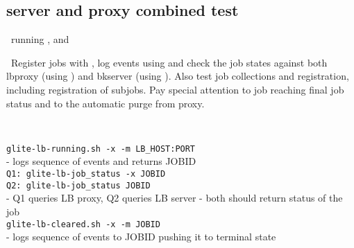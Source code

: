 




\subsection{\LB server and proxy combined test}

\req\ running ,  and

\what\ Register jobs with , log events
using  and check the job states against
both lbproxy (using ) and bkserver
(using ). Also test job collections and registration, including registration of subjobs. Pay special attention to job reaching final 
job status and to the automatic purge from proxy.


\how\ 

{\tt glite-lb-running.sh -x -m LB\_HOST:PORT} \\
- logs sequence of events and returns JOBID \\

{\tt Q1: glite-lb-job\_status -x JOBID } \\
{\tt Q2: glite-lb-job\_status JOBID } \\
- Q1 queries LB proxy, Q2 queries LB server - both should return status of the job \\

{\tt glite-lb-cleared.sh -x -m JOBID} \\
- logs sequence of events to JOBID pushing it to terminal state \\

